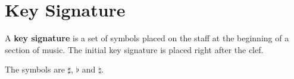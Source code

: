 \documentclass{article}
\begin{document}
\section{Key Signature}

A \textbf{key signature} is a set of symbols placed
on the staff at the beginning of a section of music.
The initial key signature is placed right after the clef.

The symbols are \(\sharp\), \(\flat\) and \(\natural\).

\end{document}

